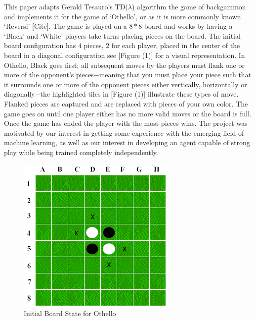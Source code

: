 \documentclass{sig-alternate-05-2015}
\begin{document}
This paper adapts Gerald Tesauro's TD(\(\lambda\)) algorithm the game of backgammon and implements it for the game of `Othello', or as it is more commonly known `Reversi' [Cite]. The game is played on a $8*8$ board and works by having a `Black' and `White' players take turns placing pieces on the board. The initial board configuration has $4$ pieces, $2$ for each player, placed in the center of the board in a diagonal configuration see [Figure (1)] for a visual representation. In Othello, Black goes first; all subsequent moves by the players  must flank one or more of the opponent's pieces$-$meaning that you must place your piece such that it surrounds one or more of the opponent pieces either vertically, horizontally or diagonally$-$the highlighted tiles in [Figure (1)] illustrate these types of move. Flanked pieces are captured and are replaced with pieces of your own color. The game goes on until one player either has no more valid moves or the board is full. Once the game has ended the player with the most pieces wins. The project was motivated by our interest in getting some experience with the emerging field of machine learning, as well as our interest in developing an agent capable of strong play while being trained completely independently. 

\begin{figure}[h!]
  \includegraphics[width=\linewidth]{stboard.png}
  \caption{Initial Board State for Othello}
  \label{fig:board1}
\end{figure}
\end{document}
